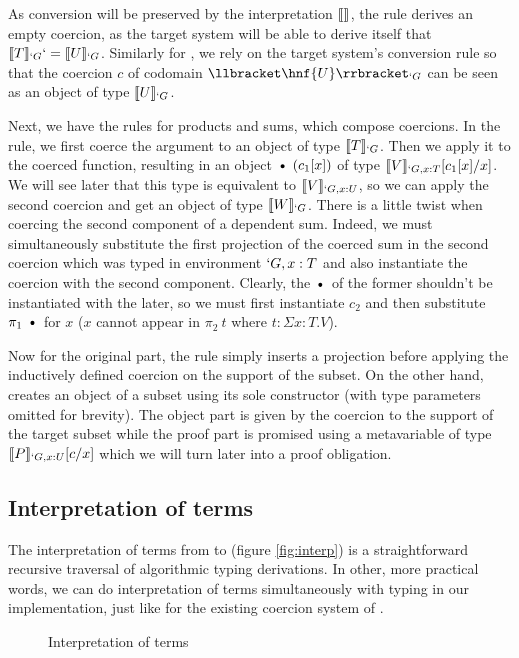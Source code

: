 \documentclass{llncs}
\begin{document}
As conversion will be preserved by the interpretation $\llbracket  \rrbracket_{}$,
the rule  derives an empty coercion, as the target system
will be able to derive itself that $\llbracket T \rrbracket_{`G} `= \llbracket U \rrbracket_{`G}$.
Similarly for , we rely on the target system's conversion
rule so that the coercion $c$ of codomain $\ip{\hnf{U}}{`G}$ can be seen
as an object of type $\llbracket U \rrbracket_{`G}$.

Next, we have the rules for products and sums, which compose
coercions. In the  rule, we first coerce the argument to
an object of type $\llbracket T \rrbracket_{`G}$. Then we apply it to the coerced
function, resulting in an object $\ctxdot~(c_1[x])$ of type
$\llbracket V \rrbracket_{`G, x : T}[c_1[x]/x]$. We will see later that this type is equivalent to
$\llbracket V \rrbracket_{`G, x : U}$, so we can apply the second coercion and get an
object of type $\llbracket W \rrbracket_{`G}$. There is a little twist when coercing the
second component of a dependent sum. Indeed, we must simultaneously
substitute the first projection of the coerced sum in the second
coercion which was typed in environment $`G, x : T$ and also instantiate
the coercion with the second component. Clearly, the $\ctxdot$ of the
former shouldn't be instantiated with the later, so we must first
instantiate $c_2$ and then substitute $\pi_1~\ctxdot$ for $x$ 
($x$ cannot appear in $\pi_2~t$ where $t : \Sigma x : T.V$).

Now for the original part, the  rule simply inserts a
projection before applying the inductively defined coercion on the
support of the subset. On the other hand,  creates an
object of a subset using its sole constructor  (with type
parameters omitted for brevity). The object
part is given by the coercion to the support of the target subset
while the proof part is promised using a metavariable of type $\llbracket P \rrbracket_{`G, x : U}[c/x]$ which
we will turn later into a proof obligation. 

\subsection{Interpretation of terms}
The interpretation of terms from \Russell to \CICq (figure
\vref{fig:interp}) is a straightforward
recursive traversal of algorithmic typing derivations. In other, more
practical words, we can do interpretation of terms simultaneously with
typing in our implementation, just like for the existing coercion system
of \Coq. 

\begin{figure}[ht]
  \vspace{-1em}
  \interparr
  \vspace{-1em}
  \caption{Interpretation of terms}
  \label{fig:interp}
  \vspace{-1em}
\end{figure}
\end{document}
